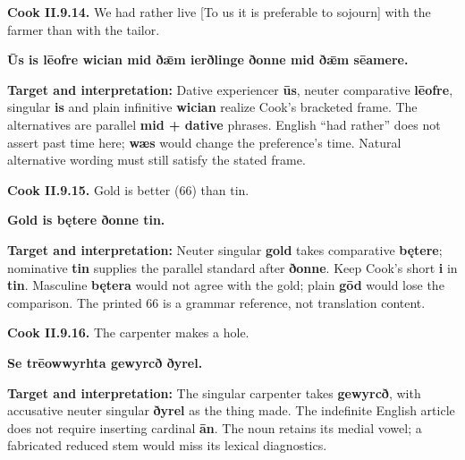 \par\begin{minipage}{\linewidth}\raggedright
\textbf{Cook II.9.14.} We had rather live [To us it is preferable to sojourn] with the farmer than with the tailor.

\textbf{Ūs is lēofre wician mid ðǣm ierðlinge ðonne mid ðǣm sēamere.}

\textbf{Target and interpretation:} Dative experiencer \textbf{ūs}, neuter comparative \textbf{lēofre}, singular \textbf{is} and plain infinitive \textbf{wician} realize Cook's bracketed frame. The alternatives are parallel \textbf{mid + dative} phrases. English “had rather” does not assert past time here; \textbf{wæs} would change the preference's time. Natural alternative wording must still satisfy the stated frame.

\end{minipage}\par\addvspace{4pt}

\par\begin{minipage}{\linewidth}\raggedright
\textbf{Cook II.9.15.} Gold is better (66) than tin.

\textbf{Gold is bętere ðonne tin.}

\textbf{Target and interpretation:} Neuter singular \textbf{gold} takes comparative \textbf{bętere}; nominative \textbf{tin} supplies the parallel standard after \textbf{ðonne}. Keep Cook's short \textbf{i} in \textbf{tin}. Masculine \textbf{bętera} would not agree with the gold; plain \textbf{gōd} would lose the comparison. The printed 66 is a grammar reference, not translation content.

\end{minipage}\par\addvspace{4pt}

\par\begin{minipage}{\linewidth}\raggedright
\textbf{Cook II.9.16.} The carpenter makes a hole.

\textbf{Se trēowwyrhta gewyrcð ðyrel.}

\textbf{Target and interpretation:} The singular carpenter takes \textbf{gewyrcð}, with accusative neuter singular \textbf{ðyrel} as the thing made. The indefinite English article does not require inserting cardinal \textbf{ān}. The noun retains its medial vowel; a fabricated reduced stem would miss its lexical diagnostics.

\end{minipage}\par\addvspace{4pt}

